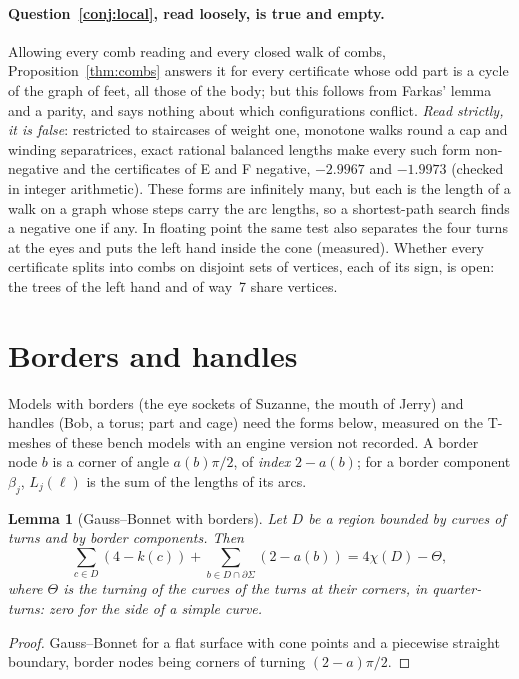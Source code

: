\documentclass[11pt,a4paper]{article}
\newtheorem{lemma}{Lemma}
\begin{document}
\paragraph{Question~\ref{conj:local}, read loosely, is true and empty.}
Allowing every comb reading and every closed walk of combs,
Proposition~\ref{thm:combs} answers it for every certificate whose odd part is
a cycle of the graph of feet, all those of the body; but this follows from
Farkas' lemma and a parity, and says nothing about which configurations
conflict. \emph{Read strictly, it is false}: restricted to staircases of
weight one, monotone walks round a cap and winding separatrices, exact
rational balanced lengths make every such form non-negative and the
certificates of E and F negative, $-2.9967$ and $-1.9973$ (checked in integer
arithmetic). These forms are infinitely many, but each is the length of a walk
on a graph whose steps carry the arc lengths, so a shortest-path search finds
a negative one if any. In floating point the same test also separates the four
turns at the eyes and puts the left hand inside the cone (measured). Whether
every certificate splits into combs on disjoint sets of vertices, each of its
sign, is open: the trees of the left hand and of way~7 share vertices.

\section{Borders and handles}\label{sec:beyond}

Models with borders (the eye sockets of Suzanne, the mouth of Jerry) and
handles (Bob, a torus; part and cage) need the forms below, measured on the
T-meshes of these bench models with an engine version not recorded. A border
node $b$ is a corner of angle $a(b)\pi/2$, of
\emph{index} $2 - a(b)$; for a border component $\beta_j$, $L_j(\ell)$ is the
sum of the lengths of its arcs.

\begin{lemma}[Gauss--Bonnet with borders]\label{lem:gauss-border}
Let $D$ be a region bounded by curves of turns and by border components. Then
\[
  \sum_{c \in D} (4 - k(c)) + \sum_{b \in D \cap \partial\Sigma} (2 - a(b))
  = 4\chi(D) - \Theta,
\]
where $\Theta$ is the turning of the curves of the turns at their corners, in
quarter-turns: zero for the side of a simple curve.
\end{lemma}
\begin{proof}
Gauss--Bonnet for a flat surface with cone points and a piecewise straight
boundary, border nodes being corners of turning $(2 - a)\pi/2$.
\end{proof}
\end{document}

